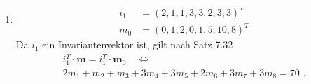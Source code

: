 \documentclass[a4paper]{scrartcl}
\newcommand{\gdw}{\Leftrightarrow}
\begin{document}
\begin{enumerate}
\begin{itemize}
        \end{itemize}

    \item
        \begin{align}
            i_1 &= \left( 2, 1, 1, 3, 3, 2, 3, 3 \right)^T \\
            m_0 &= \left( 0, 1, 2, 0, 1, 5, 10, 8 \right)^T
        \end{align}
        Da $i_1$ ein Invariantenvektor ist, gilt nach Satz 7.32
        \begin{equation}
            \begin{gathered}
                i_1^T \cdot \textbf{m} = i_1^T \cdot \textbf{m}_0 \quad \gdw \\
                2m_1 + m_2 + m_3 + 3m_4 + 3m_5 + 2m_6 + 3m_7 + 3m_8 = 70
                \text{ .}
            \end{gathered}
        \end{equation}
        


\end{enumerate}
\end{document}
